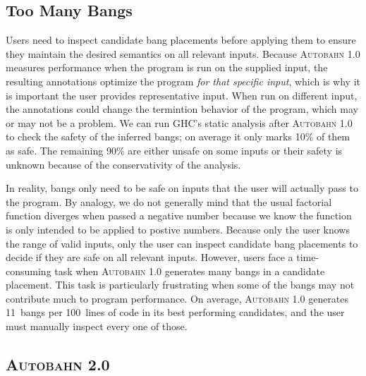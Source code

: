 \documentclass[format=sigplan, review=true]{acmart}
\newcommand{\Ao}[0]{\textsc{Autobahn 1.0}}
\newcommand{\At}[0]{\textsc{Autobahn 2.0}}
\begin{document}
\subsection{Too Many Bangs}

Users need to inspect candidate bang placements before applying them
to ensure they maintain the desired semantics on all relevant inputs.
Because \Ao{} measures performance when the program is run on the
supplied input, the resulting annotations optimize the program
\textit{for that specific input}, which is why it is important the
user provides representative input.  When run on different input, the
annotations could change the termintion behavior of the program, which
may or may not be a problem.  We can run GHC's static analysis after
\Ao{} to check the safety of the inferred bangs; on average it
only marks 10\% of them as safe.  The remaining 90\% are either unsafe
on some inputs or their safety is unknown because of the
conservativity of the analysis.


In reality, bangs only need to be safe on inputs that the user will
actually pass to the program.  By analogy, we do not generally mind
that the usual factorial function diverges when passed a negative
number because we know the function is only intended to be applied to
postive numbers.  Because only the user knows the range of valid
inputs, only the user can inspect candidate bang placements to decide
if they are safe on all relevant inputs. However, users face a
time-consuming task when \Ao{} generates many bangs in a candidate
placement.  This task is particularly frustrating when some of the
bangs may not contribute much to program performance. On average,
\Ao{} generates 11~bangs per 100~lines of code in its best performing
candidates, and the user must manually inspect every one of those.

\subsection{\At{}}
\end{document}
